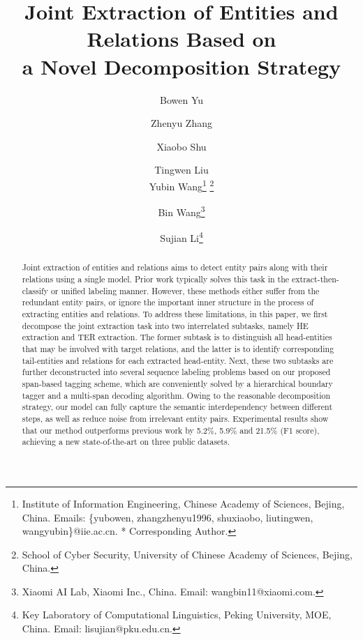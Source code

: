 \documentclass{ecai}
\begin{document}
\title{Joint Extraction of Entities and Relations Based on \\ a Novel Decomposition Strategy}

\author{
Bowen Yu
\and Zhenyu Zhang
\and Xiaobo Shu
\and Tingwen Liu 
\\ Yubin Wang\thanks{Institute of Information Engineering, Chinese Academy of Sciences, Bejing, China. Emails: \{yubowen, zhangzhenyu1996, shuxiaobo, liutingwen, wangyubin\}@iie.ac.cn. * Corresponding Author.} \thanks{School of Cyber Security, University of Chinese Academy of Sciences, Bejing, China.}
\and Bin Wang\thanks{Xiaomi AI Lab, Xiaomi Inc., China. Email: wangbin11@xiaomi.com.}
\and Sujian Li\thanks{Key Laboratory of Computational Linguistics, Peking University, MOE, China. Email: lisujian@pku.edu.cn.}}

\maketitle


\begin{abstract}
Joint extraction of entities and relations aims to detect entity pairs along with their relations using a single model.
Prior work typically solves this task in the extract-then-classify or unified labeling manner.
However, these methods either suffer from the redundant entity pairs, or ignore the important inner structure in the process of extracting entities and relations.
To address these limitations, in this paper, we first decompose the joint extraction task into two interrelated subtasks, namely HE extraction and TER extraction.
The former subtask is to distinguish all head-entities that may be involved with target relations, and the latter is to identify corresponding tail-entities and relations for each extracted head-entity. 
Next, these two subtasks are further deconstructed into several sequence labeling problems based on our proposed span-based tagging scheme, which are conveniently solved by a hierarchical boundary tagger and a multi-span decoding algorithm.
Owing to the reasonable decomposition strategy, our model can fully capture the semantic interdependency between different steps, as well as reduce noise from irrelevant entity pairs.
Experimental results show that our method outperforms previous work by 5.2\%, 5.9\% and 21.5\% (F1 score), achieving a new state-of-the-art on three public datasets.
\end{abstract}
\end{document}
